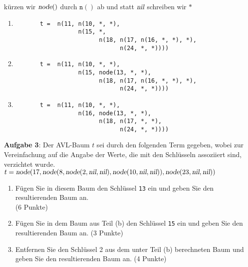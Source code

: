 \documentclass{article}
\begin{document}
k\"urzen wir $\textsl{node}()$ durch $\mathtt{n}()$ ab und statt $\textsl{nil}$ schreiben wir $\mathtt{*}$
\begin{enumerate}
\item \begin{verbatim}
       t =  n(11, n(10, *, *),
                  n(15, *, 
                        n(18, n(17, n(16, *, *), *), 
                              n(24, *, *))))
       \end{verbatim}
\item \begin{verbatim}
       t =  n(11, n(10, *, *),
                  n(15, node(13, *, *),
                        n(18, n(17, n(16, *, *), *), 
                              n(24, *, *))))
      \end{verbatim}
\item \begin{verbatim}
       t =  n(11, n(10, *, *),
                  n(16, node(13, *, *),
                        n(18, n(17, *, *), 
                              n(24, *, *))))
      \end{verbatim}
\end{enumerate}
\vspace{0.3cm}

\noindent
\textbf{Aufgabe 3}: Der AVL-Baum $t$ sei durch den folgenden Term gegeben,
wobei zur Vereinfachung auf die Angabe der Werte, die mit den Schl\"usseln
assoziiert sind, verzichtet wurde.
\\[0.2cm]
\hspace*{1.3cm}
$t = \textsl{node}(17, 
           \textsl{node}(8, 
               \textsl{node}(2, \textsl{nil}, \textsl{nil}),
               \textsl{node}(10, \textsl{nil}, \textsl{nil})), 
           \textsl{node}(23,\textsl{nil},\textsl{nil}))$
\begin{enumerate}
\item F\"ugen Sie  in diesem Baum den Schl\"ussel \texttt{13} ein und geben Sie den
      resultierenden Baum an.   \\[0.2cm]
      \hspace*{\fill} (6 Punkte)
\item F\"ugen Sie in dem Baum aus Teil (b) den Schl\"ussel \texttt{15} ein und geben Sie den
      resultierenden Baum an.
      \hspace*{\fill} (3 Punkte)
\item Entfernen Sie den Schl\"ussel 2 aus dem unter Teil (b) berechneten Baum und geben Sie
      den resultierenden Baum an.
      \hspace*{\fill} (4 Punkte)
\end{enumerate}
\pagebreak
\end{document}
